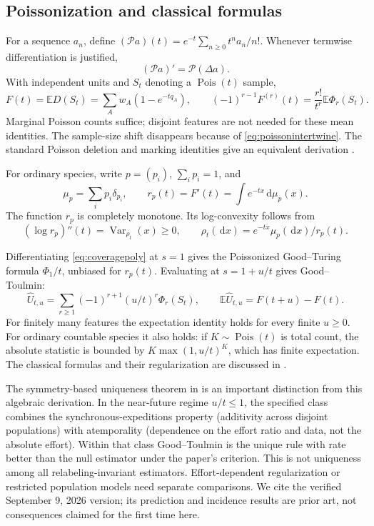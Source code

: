\documentclass[11pt]{article}
\numberwithin{equation}{section}
\theoremstyle{definition}
\theoremstyle{remark}
\newcommand{\E}{\mathbb E}
\newcommand{\Pois}{\operatorname{Pois}}
\newcommand{\Var}{\operatorname{Var}}
\newcommand{\dd}{\,\mathrm d}
\begin{document}
\subsection{Poissonization and classical formulas}
For a sequence $a_n$, define $(\mathcal Pa)(t)=e^{-t}\sum_{n\ge0}t^na_n/n!$. Whenever termwise differentiation is justified,
\begin{equation}\label{eq:poissonintertwine}
 (\mathcal Pa)'=\mathcal P(\Delta a).
\end{equation}
With independent units and $S_t$ denoting a $\Pois(t)$ sample,
\begin{equation}\label{eq:poissonfeatures}
 F(t)=\E D(S_t)=\sum_Aw_A(1-e^{-tq_A}),\qquad
 (-1)^{r-1}F^{(r)}(t)=\frac{r!}{t^r}\E\Phi_r(S_t).
\end{equation}
Marginal Poisson counts suffice; disjoint features are not needed for these mean identities. The sample-size shift disappears because of \eqref{eq:poissonintertwine}. The standard Poisson deletion and marking identities give an equivalent derivation \cite{LastPenrose2017}.

For ordinary species, write $p=(p_i)$, $\sum_i p_i=1$, and
\begin{equation}\label{eq:mu}
 \mu_p=\sum_i p_i\delta_{p_i},\qquad
 r_p(t)=F'(t)=\int e^{-tx}\dd\mu_p(x).
\end{equation}
The function $r_p$ is completely monotone. Its log-convexity follows from
\[
 (\log r_p)''(t)=\Var_{\rho_t}(x)\ge0,
 \qquad \rho_t(\dd x)=e^{-tx}\mu_p(\dd x)/r_p(t).
\]

Differentiating \eqref{eq:coveragepoly} at $s=1$ gives the Poissonized Good--Turing formula $\Phi_1/t$, unbiased for $r_p(t)$. Evaluating at $s=1+u/t$ gives Good--Toulmin:
\begin{equation}\label{eq:GT}
 \widehat U_{t,u}=\sum_{r\ge1}(-1)^{r+1}(u/t)^r\Phi_r(S_t),\qquad
 \E\widehat U_{t,u}=F(t+u)-F(t).
\end{equation}
For finitely many features the expectation identity holds for every finite $u\ge0$. For ordinary countable species it also holds: if $K\sim\Pois(t)$ is total count, the absolute statistic is bounded by $K\max(1,u/t)^K$, which has finite expectation. The classical formulas and their regularization are discussed in \cite{Good1953,GoodToulmin1956,Orlitsky2016}.

The symmetry-based uniqueness theorem in \cite[Proposition 11, Definition 12, and Theorem 14]{Eriksson2026} is an important distinction from this algebraic derivation. In the near-future regime $u/t\le1$, the specified class combines the synchronous-expeditions property (additivity across disjoint populations) with atemporality (dependence on the effort ratio and data, not the absolute effort). Within that class Good--Toulmin is the unique rule with rate better than the null estimator under the paper's criterion. This is not uniqueness among all relabeling-invariant estimators. Effort-dependent regularization or restricted population models need separate comparisons. We cite the verified September 9, 2026 version; its prediction and incidence results are prior art, not consequences claimed for the first time here.
\end{document}
